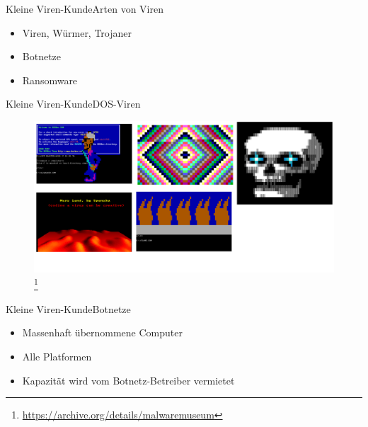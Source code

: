 \documentclass[notes,10pt]{beamer}
\begin{document}
\begin{frame}{Kleine Viren-Kunde}{Arten von Viren}
\begin{itemize}
	\item Viren, Würmer, Trojaner
	\item Botnetze
	\item Ransomware
\end{itemize}
\end{frame}

\begin{frame}{Kleine Viren-Kunde}{DOS-Viren}
	\begin{figure}[p]
		\centering
		\includegraphics[scale=0.11]{dos_viruses.png}
		\let\thefootnote\relax\footnote{\url{https://archive.org/details/malwaremuseum}}
	\end{figure}
\end{frame}


\begin{frame}{Kleine Viren-Kunde}{Botnetze}
	\begin{itemize}
		\item Massenhaft übernommene Computer
		\item Alle Platformen
		\item Kapazität wird vom Botnetz-Betreiber vermietet
	\end{itemize}
\end{frame}
\end{document}
